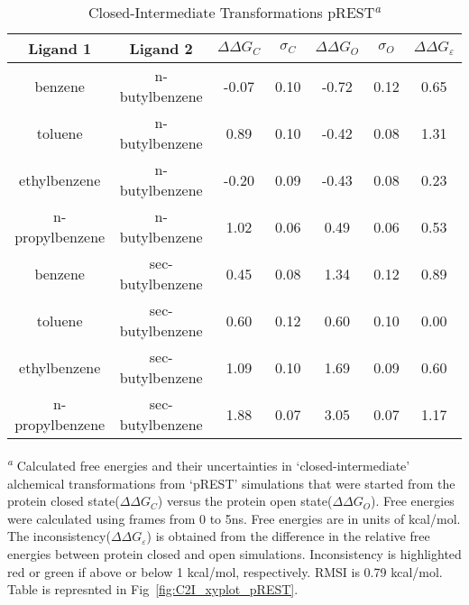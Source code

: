 \begin{table}[!htb]
 \centering
 \caption{Closed-Intermediate Transformations pREST\textsuperscript{\emph{a}}} 
 \label{tbl:C-I_pREST}
 \begin{tabular}{|c|c|c|c|c|c|c|}
 \hline
 \textbf{Ligand 1}       & \textbf{Ligand 2}    & \boldmath$\Delta\Delta G_{C}$ & \boldmath$\sigma_{C}$ & \boldmath$\Delta\Delta G_{O}$ & \boldmath$\sigma_{O}$ & \boldmath$\Delta\Delta G_{\varepsilon}$ \\ \hline
benzene         & n-butylbenzene   & -0.07   & 0.10     & -0.72     & 0.12     & \cellcolor[HTML]{9AFF99}0.65 \\ \hline
toluene         & n-butylbenzene   & 0.89    & 0.10     & -0.42     & 0.08     & \cellcolor[HTML]{FFCCC9}1.31 \\ \hline
ethylbenzene    & n-butylbenzene   & -0.20   & 0.09     & -0.43     & 0.08     & \cellcolor[HTML]{9AFF99}0.23 \\ \hline
n-propylbenzene & n-butylbenzene   & 1.02    & 0.06     & 0.49      & 0.06     & \cellcolor[HTML]{9AFF99}0.53 \\ \hline
benzene         & sec-butylbenzene & 0.45    & 0.08     & 1.34      & 0.12     & \cellcolor[HTML]{9AFF99}0.89 \\ \hline
toluene         & sec-butylbenzene & 0.60    & 0.12     & 0.60      & 0.10     & \cellcolor[HTML]{9AFF99}0.00 \\ \hline
ethylbenzene    & sec-butylbenzene & 1.09    & 0.10     & 1.69      & 0.09     & \cellcolor[HTML]{9AFF99}0.60 \\ \hline
n-propylbenzene & sec-butylbenzene & 1.88    & 0.07     & 3.05      & 0.07     & \cellcolor[HTML]{FFCCC9}1.17 \\ \hline
 \end{tabular}

\textsuperscript{\emph{a}} Calculated free energies and their uncertainties in `closed-intermediate' alchemical transformations from `pREST' simulations that were started from the protein closed state(\boldmath$\Delta\Delta G_{C}$) versus the protein open state(\boldmath$\Delta\Delta G_{O}$).
Free energies were calculated using frames from 0 to 5ns. 
Free energies are in units of kcal/mol.
The inconsistency(\boldmath$\Delta\Delta G_{\varepsilon}$) is obtained from the difference in the relative free energies between protein closed and open simulations. 
Inconsistency is highlighted red or green if above or below 1 kcal/mol, respectively.
RMSI is 0.79 kcal/mol.
Table is represnted in Fig~\ref{fig:C2I_xyplot_pREST}.
 \end{table}


